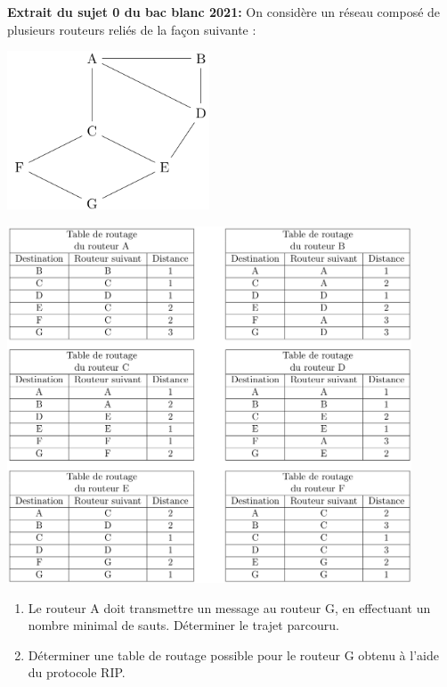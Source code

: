 \documentclass[a4paper,11pt]{article}
\begin{document}
\begin{exo}\textbf{Extrait du sujet 0 du bac blanc 2021: }
On considère un réseau composé de plusieurs routeurs reliés de la façon suivante :
\begin{center}
\centering
\includegraphics[width=6cm]{ressources/exo-bac.png}
\label{IMG}
\end{center}
\begin{center}
\centering
\includegraphics[width=12cm]{ressources/exo-bac-tables.png}
\label{IMG}
\end{center}
\begin{enumerate}
    \item Le routeur A doit transmettre un message au routeur G, en effectuant un nombre minimal de sauts. Déterminer le trajet parcouru.
    \item Déterminer une table de routage possible pour le routeur G obtenu à l’aide du protocole RIP.
\end{enumerate}
\end{exo}
\end{document}
